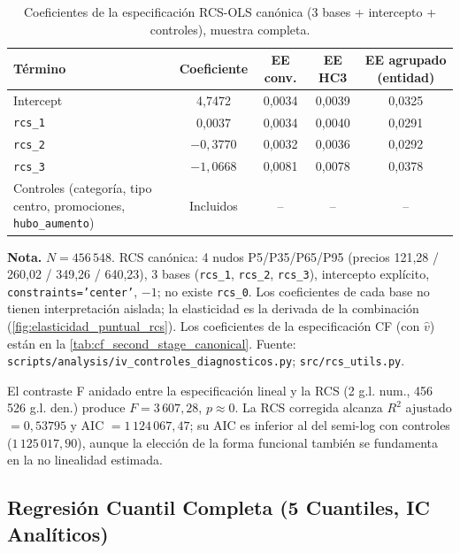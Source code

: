 \documentclass[doc, a4paper, biblatex, floatsintext, longtable, babel]{apa7}
\begin{document}
\begin{table}[!htbp]
\centering
\caption{Coeficientes de la especificación RCS-OLS canónica (3 bases + intercepto + controles), muestra completa.}
\label{tab:appendix_rcs_coef}
\footnotesize
\begin{threeparttable}
\begin{tabular}{p{5.2cm}cccc}
\toprule
Término & Coeficiente & EE conv. & EE HC3 & EE agrupado (entidad) \\
\midrule
Intercept & 4,7472 & 0,0034 & 0,0039 & 0,0325 \\
\texttt{rcs\_1} & 0,0037 & 0,0034 & 0,0040 & 0,0291 \\
\texttt{rcs\_2} & $-0,3770$ & 0,0032 & 0,0036 & 0,0292 \\
\texttt{rcs\_3} & $-1,0668$ & 0,0081 & 0,0078 & 0,0378 \\
Controles (categoría, tipo centro, promociones, \texttt{hubo\_aumento}) & Incluidos & -- & -- & -- \\
\bottomrule
\end{tabular}
\begin{tablenotes}
\footnotesize
\item \textbf{Nota.} $N = 456\,548$. RCS canónica: 4 nudos P5/P35/P65/P95 (precios 121,28 / 260,02 / 349,26 / 640,23), 3 bases (\texttt{rcs\_1}, \texttt{rcs\_2}, \texttt{rcs\_3}), intercepto explícito, \texttt{constraints='center'}, $-1$; no existe \texttt{rcs\_0}. Los coeficientes de cada base no tienen interpretación aislada; la elasticidad es la derivada de la combinación (\cref{fig:elasticidad_puntual_rcs}). Los coeficientes de la especificación CF (con $\hat{v}$) están en la \cref{tab:cf_second_stage_canonical}. Fuente: \texttt{scripts/analysis/iv\_controles\_diagnosticos.py}; \texttt{src/rcs\_utils.py}.
\end{tablenotes}
\end{threeparttable}
\end{table}

El contraste F anidado entre la especificación lineal y la RCS (2 g.l. num., 456\,526 g.l. den.) produce $F = 3\,607,28$, $p \approx 0$. La RCS corregida alcanza $R^2$ ajustado $= 0,53795$ y AIC $= 1\,124\,067,47$; su AIC es inferior al del semi-log con controles ($1\,125\,017,90$), aunque la elección de la forma funcional también se fundamenta en la no linealidad estimada.

\subsection{Regresión Cuantil Completa (5 Cuantiles, IC Analíticos)}
\label{subsec:appendix_quantile}
\end{document}
